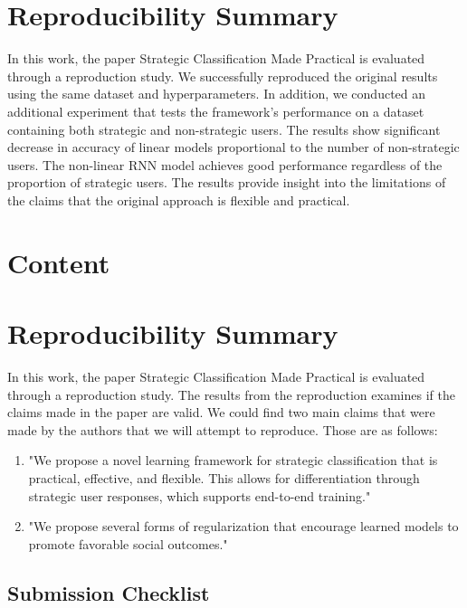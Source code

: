 \section{Reproducibility Summary}

In this work, the paper Strategic Classification Made Practical is evaluated through a reproduction study. We successfully reproduced the original results using the same dataset and hyperparameters. In addition, we conducted an additional experiment that tests the framework's performance on a dataset containing both strategic and non-strategic users. The results show significant decrease in accuracy of linear models proportional to the number of non-strategic users. The non-linear RNN model achieves good performance regardless of the proportion of strategic users. The results provide insight into the limitations of the claims that the original approach is flexible and practical.

\clearpage
\section{Content}
\section{Reproducibility Summary}

In this work, the paper Strategic Classification Made Practical\cite{levanon2021strategic} is evaluated through a reproduction study. The results from the reproduction examines if the claims made in the paper are valid. We could find two main claims that were made by the authors that we will attempt to reproduce. Those are as follows:

\begin{enumerate}
    \item "We propose a novel learning framework for strategic classification that is practical, effective, and flexible. This allows for differentiation through strategic user responses, which supports end-to-end training."
    \item "We propose several forms of regularization that encourage learned models to promote favorable social outcomes."
\end{enumerate}

\subsection{Submission Checklist}

